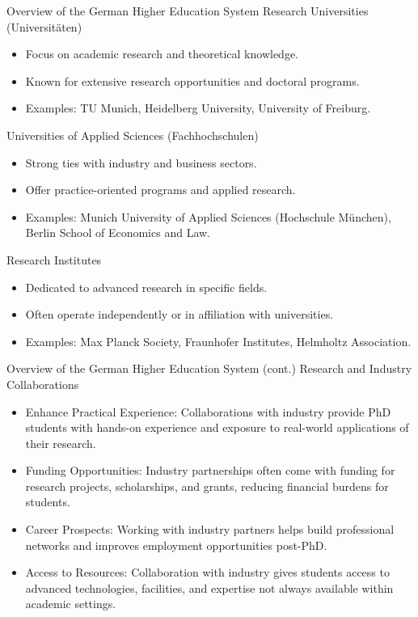 \documentclass[10pt]{beamer}
\begin{document}
\begin{frame}[fragile]{Overview of the German Higher Education System}
\alert{Research Universities (Universitäten)}
	\begin{itemize}
		\item Focus on academic research and theoretical knowledge.
		\item Known for extensive research opportunities and doctoral programs.
		\item Examples: TU Munich, Heidelberg University, University of Freiburg.
	\end{itemize}
\alert{Universities of Applied Sciences (Fachhochschulen)}
	\begin{itemize}
		\item Strong ties with industry and business sectors.
		\item Offer practice-oriented programs and applied research.
		\item Examples: Munich University of Applied Sciences (Hochschule München), Berlin School of Economics and Law. 
	\end{itemize}
\alert{Research Institutes}
	\begin{itemize}
		\item Dedicated to advanced research in specific fields.
		\item Often operate independently or in affiliation with universities.
		\item Examples: Max Planck Society, Fraunhofer Institutes, Helmholtz Association.
	\end{itemize}
\end{frame}

\begin{frame}[fragile]{Overview of the German Higher Education System (cont.)}
\alert{Research and Industry Collaborations}
	\begin{itemize}
		\item Enhance Practical Experience: Collaborations with industry provide PhD students with hands-on experience and exposure to real-world applications of their research.
		\item Funding Opportunities: Industry partnerships often come with funding for research projects, scholarships, and grants, reducing financial burdens for students.
		\item Career Prospects: Working with industry partners helps build professional networks and improves employment opportunities post-PhD.
		\item Access to Resources: Collaboration with industry gives students access to advanced technologies, facilities, and expertise not always available within academic settings.
	\end{itemize}
\end{frame}
\end{document}
